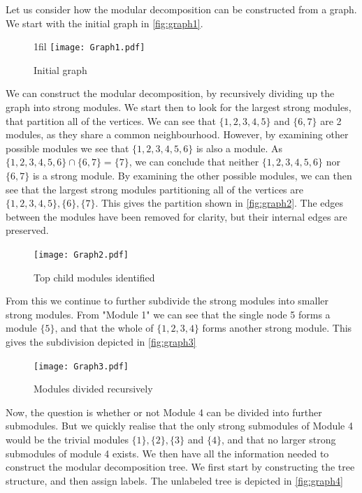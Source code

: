 \documentclass[a4paper]{article}
\makeatletter
\newcommand*{\centerfloat}{%
  \parindent \z@
  \leftskip \z@ \@plus 1fil \@minus \textwidth
  \rightskip\leftskip
  \parfillskip \z@skip}
\makeatother
\begin{document}
Let us consider how the modular decomposition can be constructed from a graph. 
We start with the initial graph in \autoref{fig:graph1}.

\begin{figure}[H]
    \centerfloat
    \texttt{[image: Graph1.pdf]}
    \caption{Initial graph}
    \label{fig:graph1}
\end{figure}

We can construct the modular decomposition, by recursively dividing up the graph
into strong modules. We start then to look for the largest strong modules, that
partition all of the vertices. We can see that $\{1,2,3,4,5\}$ and $\{6,7\}$ are
2 modules, as they share a common neighbourhood.  However, by examining other
possible modules we see that $\{1,2,3,4,5,6\}$ is also a module. As 
$\{1,2,3,4,5,6\} \cap \{6,7\} = \{7\}$, we can conclude that neither 
$\{1,2,3,4,5,6\}$ nor $\{6,7\}$ is a strong module. By examining the other
possible modules, we can then see that the largest strong modules partitioning all of 
the vertices are $\{1,2,3,4,5\},\{6\},\{7\}$. This gives
the partition shown in \autoref{fig:graph2}. The edges between the modules have
been removed for clarity, but their internal edges are preserved.

\begin{figure}[H]
    \texttt{[image: Graph2.pdf]}
    \caption{Top child modules identified}
    \label{fig:graph2}
\end{figure}

From this we continue to further subdivide the strong modules into smaller
strong modules. From "Module 1" we can see that the single node 5 forms a
module $\{5\}$, and that the whole of $\{1,2,3,4\}$ forms another strong module.  This
gives the subdivision depicted in \autoref{fig:graph3}

\begin{figure}[H]
    \texttt{[image: Graph3.pdf]}
    \caption{Modules divided recursively}
    \label{fig:graph3}
\end{figure}

Now, the question is whether or not Module 4 can be divided into further
submodules. But we quickly realise that the only strong submodules of Module 4
would be the trivial modules $\{1\},\{2\},\{3\}$ and $\{4\}$, and that no larger strong submodules
of module 4 exists. We then have all the information needed to construct the
modular decomposition tree. We first start by constructing the tree structure,
and then assign labels. The unlabeled tree is depicted in \autoref{fig:graph4}
\end{document}
